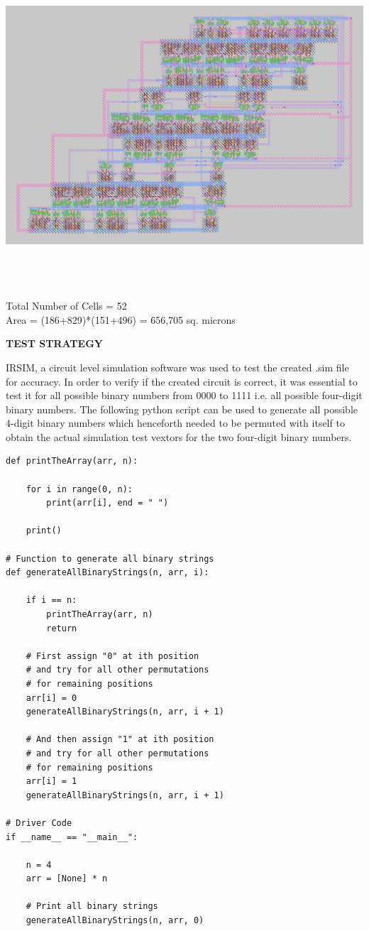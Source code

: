 \documentclass[12pt]{report}
\begin{document}
\begin{center}
\includegraphics[height=12cm, width=15cm]{Layout}
\end{center}
Total Number of Cells = 52 \\
Area = (186+829)*(151+496) = 656,705 sq. microns
\newpage
	\begin{flushleft}
		\begin{Large}
			\textbf{TEST STRATEGY}
		\end{Large}
	\end{flushleft}
IRSIM, a circuit level simulation software was used to test the created .sim file for accuracy. In order to verify if the created circuit is correct, it was essential to test it for all possible binary numbers from 0000 to 1111 i.e. all possible four-digit binary numbers. The following python script can be used to generate all possible 4-digit binary numbers which henceforth needed to be permuted with itself to obtain the actual simulation test vextors for the two four-digit binary numbers.
\begin{lstlisting}
def printTheArray(arr, n):
 
    for i in range(0, n):
        print(arr[i], end = " ")
     
    print()
 
# Function to generate all binary strings
def generateAllBinaryStrings(n, arr, i):
 
    if i == n:
        printTheArray(arr, n)
        return
     
    # First assign "0" at ith position
    # and try for all other permutations
    # for remaining positions
    arr[i] = 0
    generateAllBinaryStrings(n, arr, i + 1)
 
    # And then assign "1" at ith position
    # and try for all other permutations
    # for remaining positions
    arr[i] = 1
    generateAllBinaryStrings(n, arr, i + 1)
 
# Driver Code
if __name__ == "__main__":
 
    n = 4
    arr = [None] * n
 
    # Print all binary strings
    generateAllBinaryStrings(n, arr, 0)
\end{lstlisting}
\end{document}
